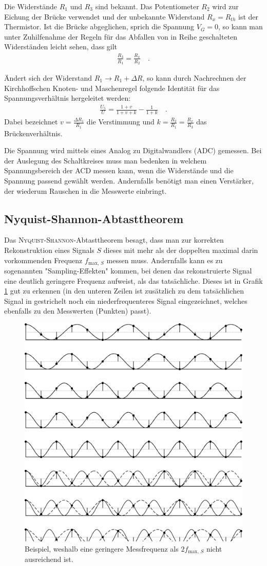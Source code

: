 \documentclass[12pt,a4paper,titlepage,headinclude]{scrartcl}
\numberwithin{equation}{subsection}
\begin{document}
Die Widerstände $R_1$ und $R_3$ sind bekannt.
Das Potentiometer $R_2$ wird zur Eichung der Brücke verwendet und der unbekannte Widerstand $R_x=R_{th}$ ist der Thermistor.
Ist die Brücke abgeglichen, sprich die Spannung $V_G=0$, so kann man unter Zuhilfenahme der Regeln für das Abfallen von in Reihe geschalteten Widerständen leicht sehen, dass gilt
\begin{align*}
	\frac{R_3}{R_1}=\frac{R_x}{R_2}\quad.
\end{align*}

Ändert sich der Widerstand $R_1\rightarrow R_1+\Delta R$, so kann durch Nachrechnen der Kirchhoffschen Knoten- und Maschenregel folgende Identität für das Spannungsverhältnis hergeleitet werden:
\begin{align}
	\frac{U_5}{U}=\frac{1+v}{1+v+k}-\frac{1}{1+k}\quad.
	\label{eq:spannungsveraeltnis}
\end{align}
Dabei bezeichnet $v=\frac{\Delta R_1}{R_1}$ die Verstimmung und $k=\frac{R_2}{R_1}=\frac{R_x}{R_3}$ das Brückenverhältnis.

Die Spannung wird mittels eines Analog zu Digitalwandlers (ADC) gemessen.
Bei der Auslegung des Schaltkreises muss man bedenken in welchem Spannungsbereich der ACD messen kann, wenn die Widerstände und die Spannung passend gewählt werden.
Andernfalls benötigt man einen Verstärker, der wiederum Rauschen in die Messwerte einbringt.

\subsection{Nyquist-Shannon-Abtasttheorem}
Das \textsc{Nyquist-Shannon}-Abtasttheorem besagt, dass man zur korrekten Rekonstruktion eines Signals $S$ dieses mit mehr als der doppelten maximal darin vorkommenden Frequenz $f_{\text{max, }S}$ messen muss.
Andernfalls kann es zu sogenannten "Sampling-Effekten" kommen, bei denen das rekonstruierte Signal eine deutlich geringere Frequenz aufweist, als das tatsächliche.
Dieses ist in Grafik \ref{fig:nyquist} gut zu erkennen (in den unteren Zeilen ist zusätzlich zu dem tatsächlichen Signal in gestrichelt noch ein niederfrequenteres Signal eingezeichnet, welches ebenfalls zu den Messwerten (Punkten) passt).
\begin{figure}[h]
  \centering
  \includegraphics[width=0.4\linewidth]{nyquist}
  \caption{Beispiel, weshalb eine geringere Messfrequenz als $2f_{\text{max, }S}$ nicht ausreichend ist.\protect\footnotemark\label{fig:nyquist}}
\end{figure}
\end{document}
